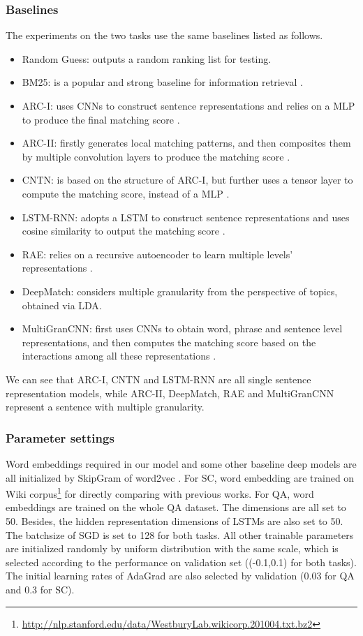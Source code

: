 \documentclass[letterpaper]{article}
\begin{document}
\subsubsection{Baselines}
The experiments on the two tasks use the same baselines listed as follows.
\begin{itemize}
\item Random Guess: outputs a random ranking list for testing.
\item BM25: is a popular and strong baseline for information retrieval \cite{robertson1995okapi}.
\item ARC-I: uses CNNs to construct sentence representations and relies on a MLP to produce the final matching score \cite{DBLP:conf/nips/HuLLC14}.
\item ARC-II: firstly generates local matching patterns, and then composites them by multiple convolution layers to produce the matching score \cite{DBLP:conf/nips/HuLLC14}.
\item CNTN: is based on the structure of ARC-I, but further uses a tensor layer to compute the matching score, instead of a MLP \cite{DBLP:conf/ijcai/QiuH15}.
\item LSTM-RNN: adopts a LSTM to construct sentence representations and uses cosine similarity to output the matching score \cite{palangi2015deep}.
\item RAE: relies on a recursive autoencoder to learn multiple levels' representations \cite{socher2011dynamic}.
\item DeepMatch: considers multiple granularity from the perspective of topics, obtained via LDA\cite{DBLP:conf/nips/LuL13}.
\item MultiGranCNN: first uses CNNs to obtain word, phrase and sentence level representations, and then computes the matching score based on the interactions among all these representations \cite{DBLP:conf/acl/YinS15}.
\end{itemize}

We can see that ARC-I, CNTN and LSTM-RNN are all single sentence representation models, while ARC-II, DeepMatch, RAE and MultiGranCNN represent a sentence with multiple granularity.

\subsubsection{Parameter settings}
Word embeddings required in our model and some other baseline deep models are all initialized by SkipGram of word2vec \cite{mikolov2013distributed}.
For SC, word embedding are trained on Wiki corpus\footnote{\url{http://nlp.stanford.edu/data/WestburyLab.wikicorp.201004.txt.bz2}} for directly comparing with previous works. For QA, word embeddings are trained on the whole QA dataset. The dimensions are all set to 50. Besides, the  hidden representation dimensions of LSTMs are also set to 50. The batchsize of SGD is set to 128 for both tasks. All other trainable parameters are initialized randomly by uniform distribution with the same scale, which is selected according to the performance on validation set ((-0.1,0.1) for both tasks). The initial learning rates of AdaGrad are also selected by validation (0.03 for QA and 0.3 for SC).
\end{document}
